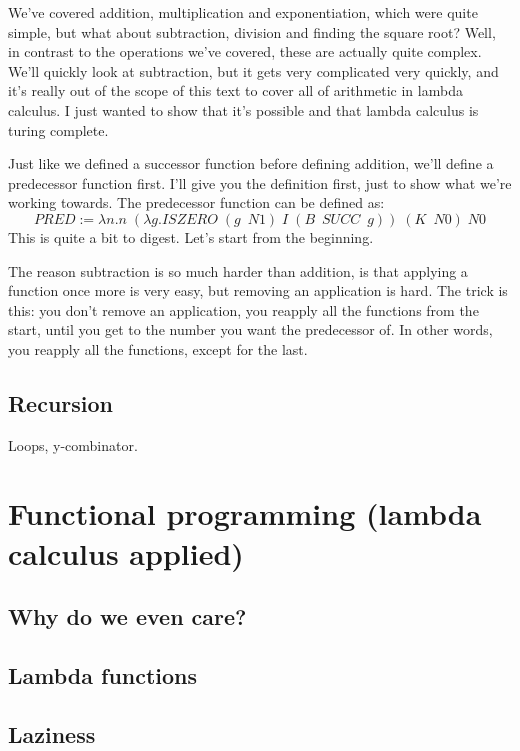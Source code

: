 \documentclass[11pt]{article}
\begin{document}
We've covered addition, multiplication and exponentiation, which were quite
simple, but what about subtraction, division and finding the square root? Well,
in contrast to the operations we've covered, these are actually quite complex.
We'll quickly look at subtraction, but it gets very complicated very quickly,
and it's really out of the scope of this text to cover all of arithmetic in
lambda calculus. I just wanted to show that it's possible and that lambda
calculus is turing complete.

Just like we defined a successor function before defining addition, we'll
define a predecessor function first. I'll give you the definition first, just
to show what we're working towards. The predecessor function can be defined as:
\[PRED:=\lambda n.n\;(\lambda g.ISZERO\;(g\enspace N1)\;I\;(B\enspace SUCC\enspace g))\;(K\enspace N0)\;N0\]
This is quite a bit to digest. Let's start from the beginning.

The reason subtraction is so much harder than addition, is that applying a
function once more is very easy, but removing an application is hard. The trick
is this: you don't remove an application, you reapply all the functions from
the start, until you get to the number you want the predecessor of. In other
words, you reapply all the functions, except for the last.


\subsection{Recursion}

Loops, y-combinator.

\section{Functional programming (lambda calculus applied)}

\subsection{Why do we even care?}

\subsection{Lambda functions}

\subsection{Laziness}
\end{document}
